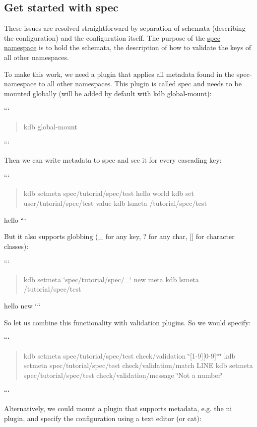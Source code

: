 \subsection*{Get started with spec}

These issues are resolved straightforward by separation of schemata (describing the configuration) and the configuration itself. The purpose of the \hyperlink{doc_tutorials_namespaces_md}{spec namespace} is to hold the schemata, the description of how to validate the keys of all other namespaces.

To make this work, we need a plugin that applies all metadata found in the {\ttfamily spec}-\/namespace to all other namespaces. This plugin is called {\ttfamily spec} and needs to be mounted globally (will be added by default with {\ttfamily kdb global-\/mount})\+:

``` \begin{quote}
kdb global-\/mount \end{quote}
```

Then we can write metadata to {\ttfamily spec} and see it for every cascading key\+:

``` \begin{quote}
kdb setmeta spec/tutorial/spec/test hello world kdb set user/tutorial/spec/test value kdb lsmeta /tutorial/spec/test \end{quote}
hello ```

But it also supports globbing ({\ttfamily \+\_\+} for any key, {\ttfamily ?} for any char, {\ttfamily \mbox{[}\mbox{]}} for character classes)\+:

``` \begin{quote}
kdb setmeta \char`\"{}spec/tutorial/spec/\+\_\+\char`\"{} new meta kdb lsmeta /tutorial/spec/test \end{quote}
hello new ```

So let us combine this functionality with validation plugins. So we would specify\+:

``` \begin{quote}
kdb setmeta spec/tutorial/spec/test check/validation \char`\"{}\mbox{[}1-\/9\mbox{]}\mbox{[}0-\/9\mbox{]}$\ast$\char`\"{} kdb setmeta spec/tutorial/spec/test check/validation/match L\+I\+N\+E kdb setmeta spec/tutorial/spec/test check/validation/message \char`\"{}\+Not a number\char`\"{} \end{quote}
```

Alternatively, we could mount a plugin that supports metadata, e.\+g. the {\ttfamily ni} plugin, and specify the configuration using a text editor (or {\ttfamily cat})\+:

